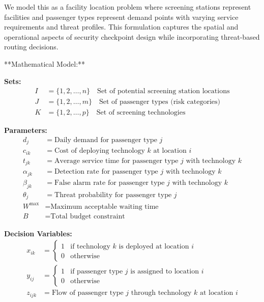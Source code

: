 \documentclass{article}
\begin{document}
We model this as a facility location problem where screening stations represent facilities and passenger types represent demand points with varying service requirements and threat profiles. This formulation captures the spatial and operational aspects of security checkpoint design while incorporating threat-based routing decisions.

**Mathematical Model:**

\textbf{Sets:}
\begin{align}
I &= \{1, 2, \ldots, n\} \quad \text{Set of potential screening station locations} \\
J &= \{1, 2, \ldots, m\} \quad \text{Set of passenger types (risk categories)} \\
K &= \{1, 2, \ldots, p\} \quad \text{Set of screening technologies}
\end{align}

\textbf{Parameters:}
\begin{align}
d_j &= \text{Daily demand for passenger type } j \\
c_{ik} &= \text{Cost of deploying technology } k \text{ at location } i \\
t_{jk} &= \text{Average service time for passenger type } j \text{ with technology } k \\
\alpha_{jk} &= \text{Detection rate for passenger type } j \text{ with technology } k \\
\beta_{jk} &= \text{False alarm rate for passenger type } j \text{ with technology } k \\
\theta_j &= \text{Threat probability for passenger type } j \\
W^{\max} &= \text{Maximum acceptable waiting time} \\
B &= \text{Total budget constraint}
\end{align}

\textbf{Decision Variables:}
\begin{align}
x_{ik} &= \begin{cases}
1 & \text{if technology } k \text{ is deployed at location } i \\
0 & \text{otherwise}
\end{cases} \\
y_{ij} &= \begin{cases}
1 & \text{if passenger type } j \text{ is assigned to location } i \\
0 & \text{otherwise}
\end{cases} \\
z_{ijk} &= \text{Flow of passenger type } j \text{ through technology } k \text{ at location } i
\end{align}
\end{document}
